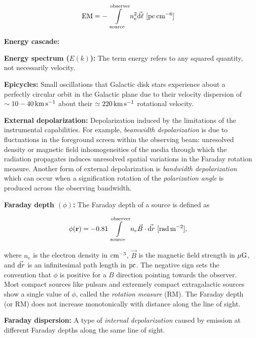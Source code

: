 \documentclass[a4paper,10pt]{article}
\begin{document}
\begin{align*}
    {\rm EM} = -\int\limits_\mathrm{source}^\mathrm{observer} n_e^2\vec{{\rm d}\ell} ~ [{\rm pc\,cm^{-6}}]
\end{align*}

{\noindent}\textbf{Energy cascade:}

{\noindent}\textbf{Energy spectrum ($E(k)$):} The term energy refers to any squared quantity, not necessarily velocity.

{\noindent}\textbf{Epicycles:} Small oscillations that Galactic disk stars experience about a perfectly circular orbit in the Galactic plane due to their velocity dispersion of $\sim10-40\,{\rm km\,s^{-1}}$ about their $\simeq220\,{\rm km\,s^{-1}}$ rotational velocity.

{\noindent}\textbf{External depolarization:} Depolarization induced by the limitations of the instrumental capabilities. For example, \textit{beamwidth depolarization} is due to fluctuations in the foreground screen within the observing beam: unresolved density or magnetic field inhomogeneities of the media through which the radiation propagates induces unresolved spatial variations in the Faraday rotation measure. Another form of external depolarization is \textit{bandwidth depolarization} which can occur when a signification rotation of the \textit{polarization angle} is produced across the observing bandwidth.

{\noindent}\textbf{Faraday depth $(\phi)$:} The Faraday depth of a source is defined as

\begin{align*}
    \phi(\mathbf{r}) = -0.81 \int\limits_\mathrm{source}^\mathrm{observer}n_e\vec{B}\cdot\vec{{\rm d}r} ~ [{\rm rad\,m^{-2}}],
\end{align*}

{\noindent}where $n_e$ is the electron density in ${\rm cm^{-3}}$, $\vec{B}$ is the magnetic field strength in $\mu{\rm G}$, and $\vec{{\rm d}r}$ is an infinitesimal path length in ${\rm pc}$. The negative sign sets the convention that $\phi$ is positive for a $B$ direction pointing towards the observer. Most compact sources like pulsars and extremely compact extragalactic sources show a single value of $\phi$, called the \textit{rotation measure} (RM). The Faraday depth (or RM) does not increase monotonically with distance along the line of sight.

{\noindent}\textbf{Faraday dispersion:} A type of \textit{internal depolarization} caused by emission at different Faraday depths along the same line of sight.
\end{document}
